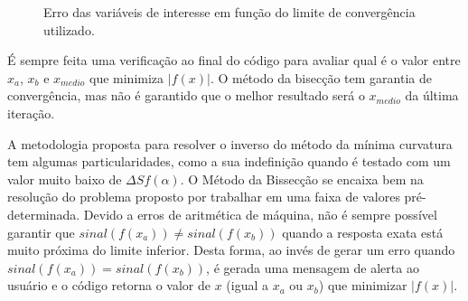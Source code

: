 \documentclass[final,5p]{elsarticle}
\numberwithin{equation}{section}
\begin{document}
    \begin{figure}
        \centering
        \caption{Erro das variáveis de interesse em função do limite de convergência utilizado.}
        \label{fig:convergencia}
    \end{figure}

    É sempre feita uma verificação ao final do código para avaliar qual é o valor entre $x_a$, $x_b$ e $x_{medio}$ que minimiza $|f(x)|$. O método da bisecção tem garantia de convergência, mas não é garantido que o melhor resultado será o $x_{medio}$ da última iteração.
    
    A metodologia proposta para resolver o inverso do método da mínima curvatura tem algumas particularidades, como a sua indefinição quando é testado com um valor muito baixo de $\Delta S f(\alpha)$. O Método da Bissecção se encaixa bem na resolução do problema proposto por trabalhar em uma faixa de valores pré-determinada. Devido a erros de aritmética de máquina, não é sempre possível garantir que $sinal(f(x_a)) \neq sinal(f(x_b))$ quando a resposta exata está muito próxima do limite inferior. Desta forma, ao invés de gerar um erro quando $sinal(f(x_a)) = sinal(f(x_b))$, é gerada uma mensagem de alerta ao usuário e o código retorna o valor de $x$ (igual a $x_a$ ou $x_b$) que minimizar $|f(x)|$.
    
\end{document}
